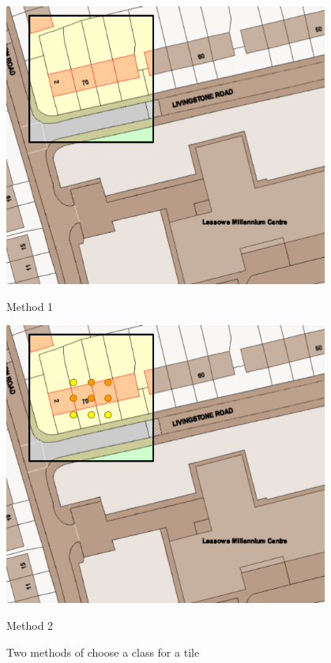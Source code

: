 \begin{figure}[H]
    \begin{minipage}{0.5\textwidth}
  \centering
  \includegraphics[width=0.95\textwidth]{figs/12/osmm_m1}
  \caption{Method 1}
  \label{fig:sub2}
\end{minipage}\hfill
\begin{minipage}{0.5\textwidth}
  \centering
  \includegraphics[width=0.95\textwidth]{figs/12/osmm_m2}
  \caption{Method 2}
  \label{fig:sub2}
\end{minipage}
\caption{Two methods of choose a class for a tile}
\label{fig:FW:methods}

\end{figure}



